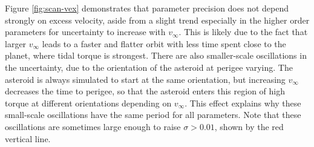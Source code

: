 \documentclass[fleqn,usenatbib]{mnras}
\begin{document}
Figure \ref{fig:scan-vex} demonstrates that parameter precision does not depend strongly on excess velocity, aside from a slight trend especially in the higher order parameters for uncertainty to increase with $v_\infty$. This is likely due to the fact that larger $v_\infty$ leads to a faster and flatter orbit with less time spent close to the planet, where tidal torque is strongest. There are also smaller-scale oscillations in the uncertainty, due to the orientation of the asteroid at perigee varying. The asteroid is always simulated to start at the same orientation, but increasing $v_\infty$ decreases the time to perigee, so that the asteroid enters this region of high torque at different orientations depending on $v_\infty$. This effect explains why these small-scale oscillations have the same period for all parameters. Note that these oscillations are sometimes large enough to raise $\sigma > 0.01$, shown by the red vertical line.
\end{document}
